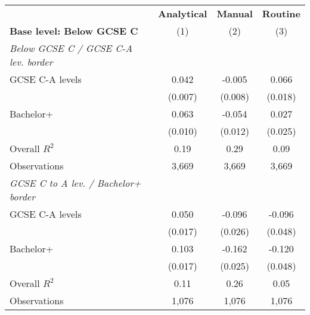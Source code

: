 \begin{center}
\begin{threeparttable}[!h]
\caption{Relative skill use in border jobs across education groups (simple average indexes)}
\label{tab:skillRegs}
\begin{tabular}{lccc}
\toprule
\toprule
&\multicolumn{1}{c}{\textbf{Analytical}}&\multicolumn{1}{c}{\textbf{Manual}}&\multicolumn{1}{c}{\textbf{Routine}} \\
\textbf{Base level: Below GCSE C}&\multicolumn{1}{c}{(1)}&\multicolumn{1}{c}{(2)}&\multicolumn{1}{c}{(3)} \\
\midrule
\textit{Below GCSE C / GCSE C-A lev. border}\vspace{1mm} \\ 
\hspace{3mm}GCSE C-A levels&       0.042\sym{***}&      -0.005         &       0.066\sym{***}\\
                    &     (0.007)         &     (0.008)         &     (0.018)         \\
\hspace{3mm}Bachelor+&       0.063\sym{***}&      -0.054\sym{***}&       0.027         \\
                    &     (0.010)         &     (0.012)         &     (0.025)         \\
\midrule Overall $ R^2$&        0.19         &        0.29         &        0.09         \\
Observations        &       3,669         &       3,669         &       3,669         \\
\midrule\textit{GCSE C to A lev. / Bachelor+ border}\vspace{1mm} \\ 
\hspace{3mm}GCSE C-A levels&       0.050\sym{**} &      -0.096\sym{***}&      -0.096\sym{*}  \\
                    &     (0.017)         &     (0.026)         &     (0.048)         \\
\hspace{3mm}Bachelor+&       0.103\sym{***}&      -0.162\sym{***}&      -0.120\sym{*}  \\
                    &     (0.017)         &     (0.025)         &     (0.048)         \\
\midrule Overall $ R^2$&        0.11         &        0.26         &        0.05         \\
Observations        &       1,076         &       1,076         &       1,076         \\

\end{tabular}
\end{threeparttable}
\end{center}
